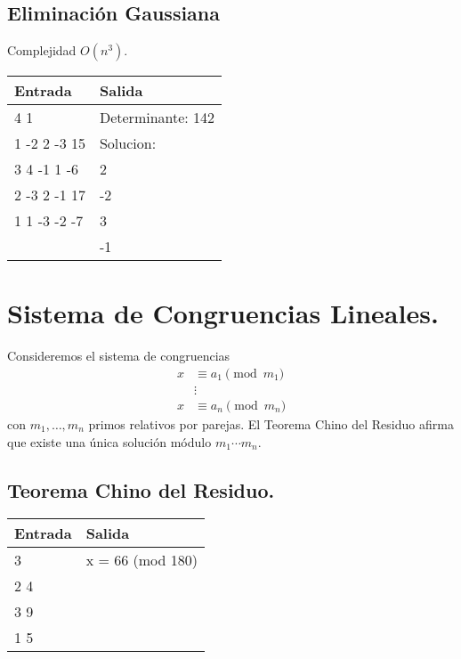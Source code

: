 \documentclass[12pt, letterpaper, twoside]{article}
\begin{document}
\subsection{Eliminación Gaussiana}

Complejidad $O(n^3)$.

 \medskip

\begin{tabular}{|p{7cm}|p{7cm}|}
\hline
\textbf{Entrada} & \textbf{Salida}\\ \hline
4 1          & Determinante: 142\\
1 -2 2 -3 15 & Solucion:\\ 
3 4 -1 1 -6  & 2\\ 
2 -3 2 -1 17 & -2\\ 
1 1 -3 -2 -7 & 3\\ 
             & -1\\ \hline
\end{tabular}

\newpage

\section{Sistema de Congruencias Lineales.}

Consideremos el sistema de congruencias
\begin{align*}
x &\equiv a_1 \pmod{m_1}\\
&\vdots\\
x &\equiv a_n \pmod{m_n}
\end{align*}
con $m_1, \ldots, m_n$ primos relativos por parejas. El Teorema Chino del Residuo afirma que existe una única solución módulo $m_1\cdots m_n$.

\subsection{Teorema Chino del Residuo.}

 \medskip

\begin{tabular}{|p{7cm}|p{7cm}|}
\hline
\textbf{Entrada} & \textbf{Salida}\\ \hline
3   & x = 66 (mod 180)\\
2 4 & \\ 
3 9 & \\ 
1 5 & \\ \hline
\end{tabular}

\newpage
\end{document}
